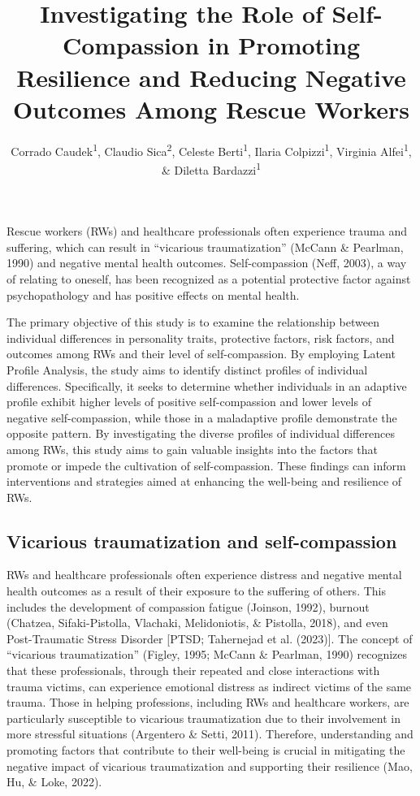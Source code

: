 \documentclass[
  man]{apa7}
\title{Investigating the Role of Self-Compassion in Promoting Resilience and Reducing Negative Outcomes Among Rescue Workers}
\author{Corrado Caudek\textsuperscript{1}, Claudio Sica\textsuperscript{2}, Celeste Berti\textsuperscript{1}, Ilaria Colpizzi\textsuperscript{1}, Virginia Alfei\textsuperscript{1}, \& Diletta Bardazzi\textsuperscript{1}}
\date{}
\affiliation{\vspace{0.5cm}\textsuperscript{1} NEUROFARBA Department, Psychology Section, University of Florence, Italy\\\textsuperscript{2} Health Sciences Department, Psychology Section, University of Florence, Italy}
\begin{document}
\maketitle

Rescue workers (RWs) and healthcare professionals often experience trauma and suffering, which can result in ``vicarious traumatization'' (McCann \& Pearlman, 1990) and negative mental health outcomes. Self-compassion (Neff, 2003), a way of relating to oneself, has been recognized as a potential protective factor against psychopathology and has positive effects on mental health.

The primary objective of this study is to examine the relationship between individual differences in personality traits, protective factors, risk factors, and outcomes among RWs and their level of self-compassion. By employing Latent Profile Analysis, the study aims to identify distinct profiles of individual differences. Specifically, it seeks to determine whether individuals in an adaptive profile exhibit higher levels of positive self-compassion and lower levels of negative self-compassion, while those in a maladaptive profile demonstrate the opposite pattern. By investigating the diverse profiles of individual differences among RWs, this study aims to gain valuable insights into the factors that promote or impede the cultivation of self-compassion. These findings can inform interventions and strategies aimed at enhancing the well-being and resilience of RWs.

\hypertarget{vicarious-traumatization-and-self-compassion}{%
\subsection{Vicarious traumatization and self-compassion}\label{vicarious-traumatization-and-self-compassion}}

RWs and healthcare professionals often experience distress and negative mental health outcomes as a result of their exposure to the suffering of others. This includes the development of compassion fatigue (Joinson, 1992), burnout (Chatzea, Sifaki-Pistolla, Vlachaki, Melidoniotis, \& Pistolla, 2018), and even Post-Traumatic Stress Disorder {[}PTSD; Tahernejad et al. (2023){]}. The concept of ``vicarious traumatization'' (Figley, 1995; McCann \& Pearlman, 1990) recognizes that these professionals, through their repeated and close interactions with trauma victims, can experience emotional distress as indirect victims of the same trauma. Those in helping professions, including RWs and healthcare workers, are particularly susceptible to vicarious traumatization due to their involvement in more stressful situations (Argentero \& Setti, 2011). Therefore, understanding and promoting factors that contribute to their well-being is crucial in mitigating the negative impact of vicarious traumatization and supporting their resilience (Mao, Hu, \& Loke, 2022).
\end{document}
